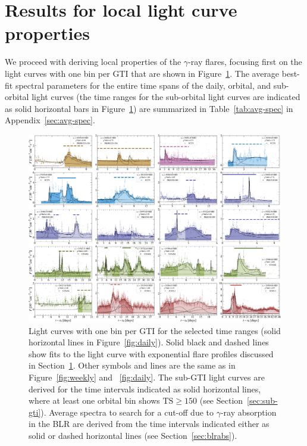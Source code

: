 \documentclass[twocolumn,linenumbers]{aastex62}
\newcommand{\gray}{$\gamma$-ray\xspace}
\begin{document}
\section{Results for local light curve properties}
\label{sec:results-local}

We proceed with deriving local properties of the \gray flares, focusing first on the light curves with one bin per GTI that are shown in Figure~\ref{fig:gti}.
The average best-fit spectral parameters for the entire time spans of the daily, orbital, and sub-orbital light curves (the time ranges for the sub-orbital light curves are indicated as solid horizontal bars in Figure~\ref{fig:gti}) are summarized in Table~\ref{tab:avg-spec} in Appendix~\ref{sec:avg-spec}. 

\begin{figure}
    \centering
    \includegraphics[width = .99\linewidth]{lcfithop_orbit_all_maxiter2_fsys0p00_addcomp0_comb.pdf}
    \caption{ Light curves with one bin per GTI for the selected time ranges (solid horizontal lines in Figure~\ref{fig:daily}). Solid black and dashed lines show fits to the light curve with exponential flare profiles discussed in Section~\ref{sec:results-local}. Other symbols and lines are the same as in Figure~\ref{fig:weekly} and ~\ref{fig:daily}.
    The sub-GTI light curves are derived for the time intervals indicated as solid horizontal lines, where at least one orbital bin shows $\mathrm{TS}\geqslant 150$ (see Section~\ref{sec:sub-gti}). 
    Average spectra to search for a cut-off due to \gray absorption in the BLR are derived from the time intervals indicated either as solid or dashed horizontal lines (see Section~\ref{sec:blrabs}).
    }
    \label{fig:gti}
\end{figure}
\end{document}
